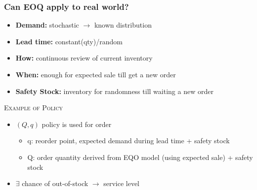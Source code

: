 \documentclass[10pt,handout,notes=show]{beamer}
\begin{document}
  \begin{frame}
  \frametitle{Can EOQ apply to real world? }

  \begin{itemize}
    \item \textbf{Demand:} stochastic $\rightarrow$ known distribution
    \item \textbf{Lead time:} constant(qty)/random
    \item \textbf{How:} continuous review of current inventory
    \item \textbf{When:} enough for \alert{expected sale} till get a new order
    \item \textbf{Safety Stock:} inventory for randomness till waiting a new order
  \end{itemize}

  \NextLine
  \begin{alertblock}{\small{\textsc{Example of Policy}}  \forIE}{}
    \begin{itemize}
      \item[]  $(Q,q)$ policy is used for order
      \begin{itemize}
        \item q: reorder point, expected demand during lead time + safety stock
        \item Q: order quantity derived from EQO model (using expected sale) + safety stock
      \end{itemize}
      \item $\exists$ chance of out-of-stock $\rightarrow$ \alert{service level}
    \end{itemize}
  \end{alertblock}

  \end{frame}
\end{document}
